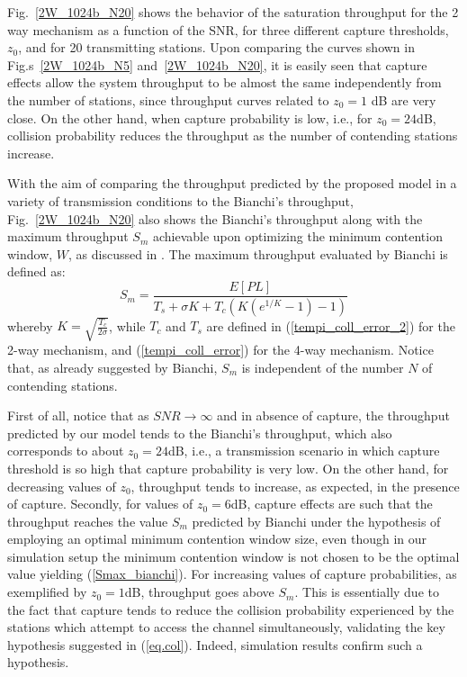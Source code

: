 \documentclass[10pt,onecolumn,a4paper]{IEEEtran}
\begin{document}
Fig.~\ref{2W_1024b_N20} shows the behavior of the saturation
throughput for the 2 way mechanism as a function of the SNR, for
three different capture thresholds, $z_0$, and for 20 transmitting
stations. Upon comparing the curves shown in
Fig.s~\ref{2W_1024b_N5} and~\ref{2W_1024b_N20}, it is easily seen
that capture effects allow the system throughput to be almost the
same independently from the number of stations, since throughput
curves related to $z_0=1$ dB are very close. On the other hand,
when capture probability is low, i.e., for $z_0=24$dB, collision
probability reduces the throughput as the number of
contending stations increase.

With the aim of comparing the throughput predicted by the proposed
model in a variety of transmission conditions to the Bianchi's
throughput, Fig.~\ref{2W_1024b_N20} also shows the Bianchi's
throughput along with the maximum throughput $S_m$ achievable upon
optimizing the minimum contention window, $W$, as discussed in
\cite{Bianchi}. The maximum throughput evaluated by Bianchi is
defined as:
\begin{equation}\label{Smax_bianchi}
S_m=\frac{E[PL]}{T_s+\sigma K+T_c\left(K(e^{1/K}-1)-1\right)}
\end{equation}
whereby $K=\sqrt{\frac{T_c}{2\sigma}}$, while $T_c$ and $T_s$ are
defined in (\ref{tempi_coll_error_2}) for the 2-way mechanism, and
(\ref{tempi_coll_error}) for the 4-way mechanism. Notice that, as
already suggested by Bianchi, $S_m$ is independent of the number
$N$ of contending stations.

First of all, notice that as $SNR\rightarrow\infty$ and in absence
of capture, the throughput predicted by our model tends to the
Bianchi's throughput, which also corresponds to about $z_0=24$dB,
i.e., a transmission scenario in which capture threshold is so
high that capture probability is very low. On the other hand, for
decreasing values of $z_0$, throughput tends to increase, as
expected, in the presence of capture. Secondly, for values of
$z_0=6$dB, capture effects are such that the throughput reaches
the value $S_m$ predicted by Bianchi under the hypothesis of
employing an optimal minimum contention window size, even though
in our simulation setup the minimum contention window is not
chosen to be the optimal value yielding (\ref{Smax_bianchi}). For
increasing values of capture probabilities, as exemplified by
$z_0=1$dB, throughput goes above $S_m$. This is essentially due to
the fact that capture tends to reduce the collision probability
experienced by the stations which attempt to access the channel simultaneously,
validating the key hypothesis suggested in
(\ref{eq.col}). Indeed, simulation results confirm such a
hypothesis.
\end{document}
